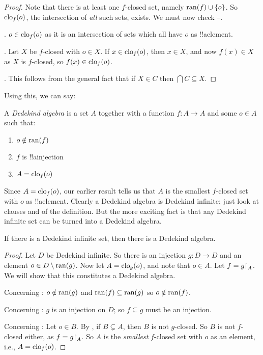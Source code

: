 \documentclass[../../../include/open-logic-section]{subfiles}
\begin{document}
\begin{proof}
Note that there is at least one $f$-closed set, namely $\mathrm{ran}(f)\cup
\{o\}$. So $\mathrm{clo}_{f}(o)$, the intersection of \emph{all}
such sets, exists. We must now check
--.

. $o \in \mathrm{clo}_{f}(o)$ as it is an
intersection of sets which all have $o$ as !!a{element}. 

. Let $X$ be $f$-closed with $o \in X$. If $x \in
\mathrm{clo}_{f}(o)$, then $x \in X$, and now $f(x) \in X$ as $X$ is
$f$-closed, so $f(x) \in \mathrm{clo}_{f}(o)$.

. This follows from the general fact that if $X
\in C$ then $\bigcap C \subseteq X$.
\end{proof}

Using this, we can say:

\begin{defn}
A \emph{Dedekind algebra} is a set $A$ together with a function $f
\colon A \to A$ and some $o \in A$  such that:
	\begin{enumerate}
		\item {} $o \notin \mathrm{ran}(f)$
		\item {} $f$ is !!a{injection}
		\item {} $A = \mathrm{clo}_{f}(o)$
	\end{enumerate}
\end{defn}

Since $A = \mathrm{clo}_{f}(o)$, our earlier result tells us that
$A$ is the smallest $f$-closed set with $o$ as !!a{element}. Clearly a
Dedekind algebra is Dedekind infinite; just look at clauses
 and  of the definition. But
the more exciting fact is that any Dedekind infinite set can be turned
into a Dedekind algebra. 

\begin{thm}
If there is a Dedekind infinite set, then there is a Dedekind algebra.
\end{thm}

\begin{proof}
Let $D$ be Dedekind infinite. So there is an injection $g \colon D \to
D$ and an element $o  \in D \setminus \mathrm{ran}(g)$. Now let $A =
\mathrm{clo}_{g}(o)$, and note that $o \in A$. Let $f =
g\mathord{\restriction}_{A}$. We will show that this constitutes a Dedekind
algebra. 

Concerning : $o \notin \mathrm{ran}(g)$ and $\mathrm{ran}(f)
\subseteq \mathrm{ran}(g)$ so $o\notin \mathrm{ran}(f)$.

Concerning : $g$ is an injection on $D$; so $f
\subseteq g$ must be an injection.

Concerning : Let $o \in B$. By
, if $B \subsetneq A$, then $B$ is not
$g$-closed. So $B$ is not $f$-closed either, as $f =
g\mathord{\restriction}_{A}$. So $A$ is the \emph{smallest} $f$-closed set
with $o$ as an element, i.e., $A = \mathrm{clo}_{f}(o)$.
\end{proof}
\end{document}

